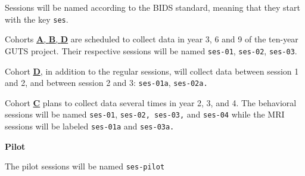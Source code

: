 \documentclass[
  letterpaper,
  DIV=11,
  numbers=noendperiod]{scrreprt}
\begin{document}
\begin{tcolorbox}[enhanced jigsaw, arc=.35mm, left=2mm, colbacktitle=quarto-callout-tip-color!10!white, bottomtitle=1mm, toptitle=1mm, titlerule=0mm, leftrule=.75mm, breakable, colframe=quarto-callout-tip-color-frame, colback=white, opacitybacktitle=0.6, coltitle=black, opacityback=0, rightrule=.15mm, toprule=.15mm, bottomrule=.15mm, title={Sessions}]

Sessions will be named according to the BIDS standard, meaning that they
start with the key \texttt{\textquotesingle{}ses\textquotesingle{}}.

Cohorts \ul{\textbf{A}, \textbf{B}, \textbf{D}} are scheduled to collect
data in year 3, 6 and 9 of the ten-year GUTS project. Their respective
sessions will be named
\texttt{\textquotesingle{}ses-01\textquotesingle{}},
\texttt{\textquotesingle{}ses-02\textquotesingle{}},
\texttt{\textquotesingle{}ses-03\textquotesingle{}}.

Cohort \ul{\textbf{D}}, in addition to the regular sessions, will
collect data between session 1 and 2, and between session 2 and 3:
\texttt{\textasciigrave{}ses-01a\textquotesingle{}},
\texttt{\textquotesingle{}ses-02a\textquotesingle{}.}

Cohort \ul{\textbf{C}} plans to collect data several times in year 2, 3,
and 4. The behavioral sessions will be named
\texttt{\textquotesingle{}ses-01\textquotesingle{}}\ul{,}
\texttt{\textquotesingle{}ses-02\textquotesingle{},\ \textquotesingle{}ses-03\textquotesingle{},}
and \texttt{\textquotesingle{}ses-04\textquotesingle{}} while the MRI
sessions will be labeled
\texttt{\textasciigrave{}ses-01a\textquotesingle{}} and
\texttt{\textquotesingle{}ses-03a\textquotesingle{}.}

\textbf{Pilot}

The pilot sessions will be named
\texttt{\textquotesingle{}ses-pilot\textquotesingle{}}

\end{tcolorbox}
\end{document}
